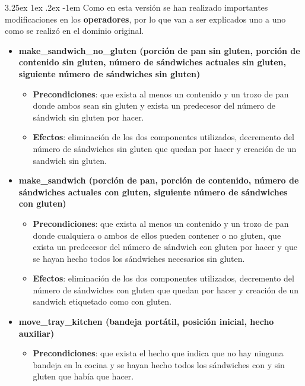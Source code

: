 \documentclass{article}
\makeatletter
\renewcommand\paragraph{\@startsection{paragraph}{5}{\z@}%
      {3.25ex \@plus1ex \@minus.2ex}%
      {-1em}%
      {\normalfont\normalsize\bfseries}}
\makeatother
\begin{document}
    \paragraph{}
    Como en esta versión se han realizado importantes modificaciones en los \textbf{operadores}, por lo que van a ser explicados uno a uno como se realizó en el dominio original.
    
    \begin{itemize}
        \item \textbf{make\_sandwich\_no\_gluten (porción de pan sin gluten, porción de contenido sin gluten, número de sándwiches actuales sin gluten, siguiente número de sándwiches sin gluten)}
            \begin{itemize}
                \item \textbf{Precondiciones}: que exista al menos un contenido y un trozo de pan donde ambos sean sin gluten y exista un predecesor del número de sándwich sin gluten por hacer.
                \item \textbf{Efectos}: eliminación de los dos componentes utilizados, decremento del número de sándwiches sin gluten que quedan por hacer y creación de un sandwich sin gluten.
            \end{itemize}
        \item \textbf{make\_sandwich (porción de pan, porción de contenido, número de sándwiches actuales con gluten, siguiente número de sándwiches con gluten)}
            \begin{itemize}
                \item \textbf{Precondiciones}: que exista al menos un contenido y un trozo de pan donde cualquiera o ambos de ellos pueden contener o no gluten, que exista un predecesor del número de sándwich con gluten por hacer y que se hayan hecho todos los sándwiches necesarios sin gluten.
                \item \textbf{Efectos}: eliminación de los dos componentes utilizados, decremento del número de sándwiches con gluten que quedan por hacer y creación de un sandwich etiquetado como con gluten.
            \end{itemize}
        \item \textbf{move\_tray\_kitchen (bandeja portátil, posición inicial, hecho auxiliar)}
            \begin{itemize}
                \item \textbf{Precondiciones}: que exista el hecho que indica que no hay ninguna bandeja en la cocina y se hayan hecho todos los sándwiches con y sin gluten que había que hacer.

\end{itemize}
\end{itemize}
\end{document}
